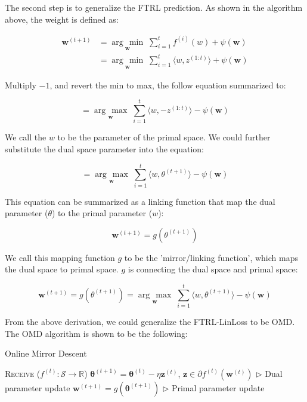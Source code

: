 \documentclass[11pt]{article}
\newcommand{\argmin}[1]{\underset{#1}{\operatorname{arg}\,\operatorname{min}}\;}
\newcommand{\argmax}[1]{\underset{#1}{\operatorname{arg}\,\operatorname{max}}\;}
\begin{document}
The second step is to generalize the FTRL prediction. As shown in the algorithm above, the weight is defined as:

\begin{align*}
    \bm{w}^{(t+1)} &= \argmin{\bm{w}} \sum^{t}_{i=1} f^{(i)}(w) + \psi (\bm{w})\\
    &= \argmin{\bm{w}} \sum^{t}_{i=1} \langle w,z^{(1:t)} \rangle + \psi (\bm{w})
\end{align*}
    

Multiply $-1$, and revert the min to max, the follow equation summarized to:

\begin{equation*}
    = \argmax{\bm{w}} \sum^{t}_{i=1} \langle w, -z^{(1:t)} \rangle - \psi (\bm{w})
\end{equation*}

We call the $w$ to be the parameter of the primal space.  We could further substitute the dual space parameter into the equation:

\begin{equation*}
     = \argmax{\bm{w}} \sum^{t}_{i=1} \langle w, \theta^{(t+1)} \rangle - \psi (\bm{w})
\end{equation*}

This equation can be summarized as a linking function that map the dual parameter ($\theta$) to the primal parameter ($w$):

\begin{equation*}
   \bm{w}^{(t+1)} = g(\theta^{(t+1)})
\end{equation*}

We call this mapping function $g$ to be the 'mirror/linking function', which maps the dual space to primal space. $g$ is connecting the dual space and primal space:

\begin{equation*}
   \bm{w}^{(t+1)} = g(\theta^{(t+1)}) = \argmax{\bm{w}} \sum^{t}_{i=1} \langle w, \theta^{(t+1)} \rangle - \psi (\bm{w})
\end{equation*}

From the above derivation, we could generalize the FTRL-LinLoss to be OMD. The OMD algorithm is shown to be the following:

\begin{algorithm}
  \caption{Online Mirror Descent}
  \label{algo:omd}
  \begin{algorithmic}[1]
            \State \textsc{Receive} ($f^{(t)}:\mathcal{S}\rightarrow \mathbb{R}$)
            \State $\bm{\theta}^{(t+1)} = \bm{\theta}^{(t)} - \eta \bm{z}^{(t)}$, $\bm{z} \in \partial f^{(t)}(\bm{w}^{(t)})$
            \hfill $\triangleright$ Dual parameter update
            \State $\bm{w}^{(t+1)} = g(\bm{\theta}^{(t+1)})$
            \hfill $\triangleright$ Primal parameter update

  \end{algorithmic}
\end{algorithm}
\end{document}
